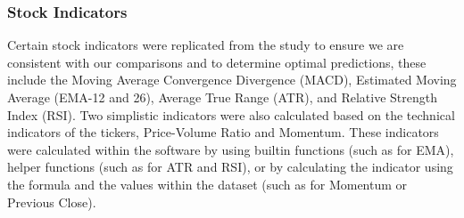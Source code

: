 \documentclass{article}
\begin{document}
\subsubsection*{Stock Indicators}
Certain stock indicators were replicated from the study to ensure we are consistent with our comparisons and to determine optimal predictions, these include the Moving Average Convergence Divergence (MACD), Estimated Moving Average (EMA-12 and 26), Average True Range (ATR), and Relative Strength Index (RSI). Two simplistic indicators were also calculated based on the technical indicators of the tickers, Price-Volume Ratio and Momentum. These indicators were calculated within the software by using builtin functions (such as for EMA), helper functions (such as for ATR and RSI), or by calculating the indicator using the formula and the values within the dataset (such as for Momentum or Previous Close).   
\end{document}
